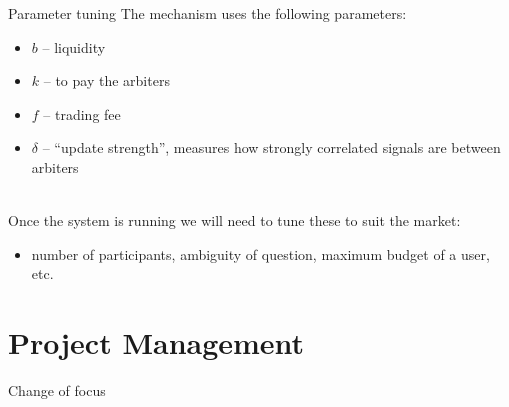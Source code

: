\documentclass[9pt]{beamer}
\begin{document}
\begin{frame}{Parameter tuning}
    The mechanism uses the following parameters:
    \begin{itemize}
        \item $b$ -- liquidity
        \item $k$ -- to pay the arbiters
        \item $f$ -- trading fee
        \item $\delta$ -- ``update strength'', measures how strongly correlated signals are between arbiters
    \end{itemize}~\\
    
    Once the system is running we will need to tune these to suit the market:
    \begin{itemize}
        \item number of participants, ambiguity of question, maximum budget of a user, etc.
    \end{itemize}
\end{frame}

\section{Project Management}

\begin{frame}{Change of focus}
    ~\\
    
\end{frame}
\end{document}
